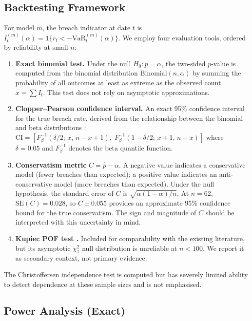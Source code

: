 \documentclass[12pt,a4paper]{article}
\begin{document}
\subsection{Backtesting Framework}

For model $m$, the breach indicator at date $t$ is $I_t^{(m)}(\alpha) = \mathbf{1}\{ r_t < -\mathrm{VaR}_t^{(m)}(\alpha) \}$. We employ four evaluation tools, ordered by reliability at small $n$:

\begin{enumerate}
    \item \textbf{Exact binomial test.} Under the null $H_0: p = \alpha$, the two-sided $p$-value is computed from the binomial distribution $\mathrm{Binomial}(n, \alpha)$ by summing the probability of all outcomes at least as extreme as the observed count $x = \sum I_t$. This test does not rely on asymptotic approximations.
    \item \textbf{Clopper--Pearson confidence interval.} An exact 95\% confidence interval for the true breach rate, derived from the relationship between the binomial and beta distributions \cite{clopper1934use}: $\mathrm{CI} = [F^{-1}_{\beta}(\delta/2;\, x,\, n-x+1),\; F^{-1}_{\beta}(1-\delta/2;\, x+1,\, n-x)]$ where $\delta = 0.05$ and $F^{-1}_{\beta}$ denotes the beta quantile function.
    \item \textbf{Conservatism metric} $C = \hat{p} - \alpha$. A negative value indicates a conservative model (fewer breaches than expected); a positive value indicates an anti-conservative model (more breaches than expected). Under the null hypothesis, the standard error of $C$ is $\sqrt{\alpha(1-\alpha)/n}$. At $n = 62$, $\mathrm{SE}(C) = 0.028$, so $C \pm 0.055$ provides an approximate 95\% confidence bound for the true conservatism. The sign and magnitude of $C$ should be interpreted with this uncertainty in mind.
    \item \textbf{Kupiec POF test \cite{kupiec1995techniques}.} Included for comparability with the existing literature, but its asymptotic $\chi^2_1$ null distribution is unreliable at $n < 100$. We report it as secondary context, not primary evidence.
\end{enumerate}

The Christoffersen independence test is computed but has severely limited ability to detect dependence at these sample sizes and is not emphasised.

\subsection{Power Analysis (Exact)}
\end{document}
